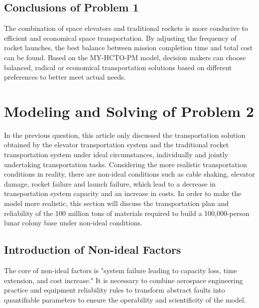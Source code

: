 \subsection{Conclusions of Problem 1}
The combination of space elevators and traditional rockets is more conducive to efficient and economical space transportation. By adjusting the frequency of rocket launches, the best balance between mission completion time and total cost can be found.
Based on the MY-HCTO-PM model, decision makers can choose balanced, radical or economical transportation solutions based on different preferences to better meet actual needs.


\section{Modeling and Solving of Problem 2}

In the previous question, this article only discussed the transportation solution obtained by the elevator transportation system and the traditional rocket transportation system under ideal circumstances, individually and jointly undertaking transportation tasks.
Considering the more realistic transportation conditions in reality, there are non-ideal conditions such as cable shaking, elevator damage, rocket failure and launch failure, which lead to a decrease in transportation system capacity and an increase in costs. 
In order to make the model more realistic, this section will discuss the transportation plan and reliability of the 100 million tons of materials required to build a 100,000-person lunar colony base under non-ideal conditions.

\subsection{Introduction of Non-ideal Factors}

The core of non-ideal factors is "system failure leading to capacity loss, time extension, and cost increase." It is necessary to combine aerospace engineering practice and equipment reliability rules to transform abstract faults into quantifiable parameters to ensure the operability and scientificity of the model.

